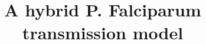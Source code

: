 \documentclass{bmcart}
\begin{document}
\begin{frontmatter}

\begin{fmbox}


\title{A hybrid P. Falciparum transmission model}


\author[
   addressref={aff1},                   %
   corref={aff1},                       %
   noteref={n1},                        %
   email={giovanni.charles10@imperial.ac.uk}   %
]{ }



\address[id=aff1]{%
  , %
  ,                      %
  ,                              %
}


\end{fmbox}
\end{frontmatter}
\end{document}
